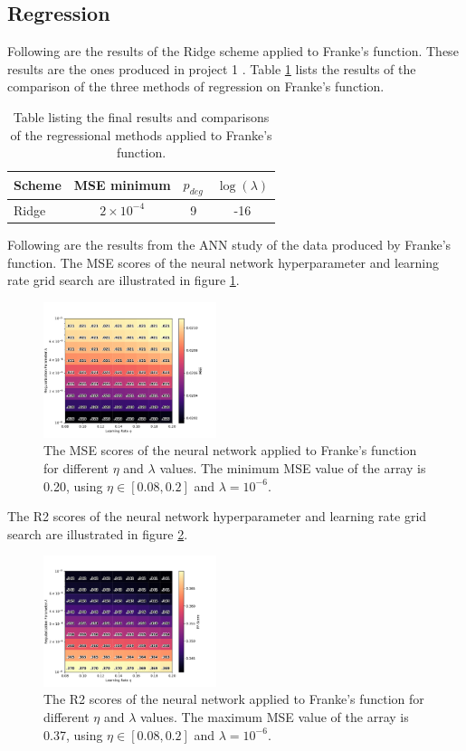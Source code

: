     \subsection{Regression}
    	Following are the results of the Ridge scheme applied to Franke's function. These results are the ones produced in project 1 \cite{4}. Table \ref{tab:conclusion_table_Frankes} lists the results of the comparison of the three methods of regression on Franke's function.
    	\begin{table}[H]
    		\centering
    		\begin{tabular}[t]{l@{\hskip 0.3in}c@{\hskip 0.3in}c@{\hskip 0.2in}c}
    			\toprule
    			Scheme & MSE minimum & $p_{deg}$ & $\log(\lambda)$ \\
    			\midrule
    			Ridge & $2\times 10^{-4}$ & 9 & -16\\
    			\bottomrule
    		\end{tabular}
	    	\caption{Table listing the final results and comparisons of the regressional methods applied to Franke's function.}
    		\label{tab:conclusion_table_Frankes}
    	\end{table}
    	Following are the results from the ANN study of the data produced by Franke's function. The MSE scores of the neural network hyperparameter and learning rate grid search are illustrated in figure \ref{fig:ff_mse}.
    	\begin{figure}[H]
    		\centering
    		\includegraphics[width=0.45\textwidth]{figures/ff_res_0.pdf}
    		\caption{The MSE scores of the neural network applied to Franke's function for different $\eta$ and $\lambda$ values. The minimum MSE value of the array is 0.20, using $\eta \in [0.08, 0.2]$ and $\lambda=10^{-6}$.}
    		\label{fig:ff_mse}
    	\end{figure}
	    The R2 scores of the neural network hyperparameter and learning rate grid search are illustrated in figure \ref{fig:ff_r2}.
    	\begin{figure}[H]
    		\centering
    		\includegraphics[width=0.45\textwidth]{figures/ff_res_1.pdf}
    		\caption{The R2 scores of the neural network applied to Franke's function for different $\eta$ and $\lambda$ values. The maximum MSE value of the array is 0.37, using $\eta \in [0.08, 0.2]$ and $\lambda=10^{-6}$.}
    		\label{fig:ff_r2}
    	\end{figure}